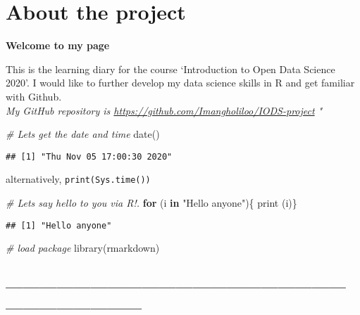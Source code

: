 \documentclass[
]{article}
\author{}
\date{\vspace{-2.5em}}
\newenvironment{Shaded}{\begin{snugshade}}{\end{snugshade}}
\newcommand{\CommentTok}[1]{\textcolor[rgb]{0.56,0.35,0.01}{\textit{#1}}}
\newcommand{\ControlFlowTok}[1]{\textcolor[rgb]{0.13,0.29,0.53}{\textbf{#1}}}
\newcommand{\FunctionTok}[1]{\textcolor[rgb]{0.00,0.00,0.00}{#1}}
\newcommand{\NormalTok}[1]{#1}
\newcommand{\StringTok}[1]{\textcolor[rgb]{0.31,0.60,0.02}{#1}}
\begin{document}
\hypertarget{about-the-project}{%
\section{About the project}\label{about-the-project}}

\textbf{Welcome to my page}

This is the learning diary for the course `Introduction to Open Data
Science 2020'. I would like to further develop my data science skills in
R and get familiar with Github.\\
\emph{My GitHub repository is
\url{https://github.com/Imangholiloo/IODS-project} "}

\begin{Shaded}
\begin{Highlighting}[]
\CommentTok{\# Let\textquotesingle{}s get the date and time}
\FunctionTok{date}\NormalTok{()}
\end{Highlighting}
\end{Shaded}

\begin{verbatim}
## [1] "Thu Nov 05 17:00:30 2020"
\end{verbatim}

alternatively, \texttt{print(Sys.time())}

\begin{Shaded}
\begin{Highlighting}[]
\CommentTok{\# Let\textquotesingle{}s say hello to you via R!.}
\ControlFlowTok{for}\NormalTok{  (i }\ControlFlowTok{in} \StringTok{"Hello anyone"}\NormalTok{)\{}
  \FunctionTok{print}\NormalTok{ (i)\}}
\end{Highlighting}
\end{Shaded}

\begin{verbatim}
## [1] "Hello anyone"
\end{verbatim}

\begin{Shaded}
\begin{Highlighting}[]
\CommentTok{\# load package}
\FunctionTok{library}\NormalTok{(rmarkdown)}
\end{Highlighting}
\end{Shaded}

\hypertarget{section}{%
\subsection{------------------------------------------------------------------------------------}\label{section}}
\end{document}
